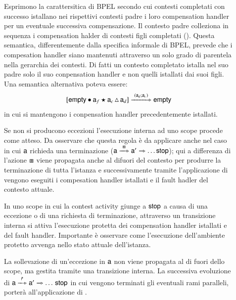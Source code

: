 \begin{description}
  \item[ ] Esprimono la carattersitica
  di BPEL secondo cui contesti completati con successo istallano nei rispettivi
  contesti padre i loro compensation handler per un eventuale successiva
  compensazione. Il contesto padre colleziona in sequenza i compensation halder
  di contesti figli completati (). Questa
  semantica, differentemente dalla specifica informale di BPEL, prevede che i
  compesation handler siano mantenuti attraverso un solo grado di parentela
  nella gerarchia dei contesti. Di fatti un contesto completato istalla nel suo
  padre solo il suo conpensation handler e non quelli istallati dai suoi figli.
  Una semantica alternativa poteva essere:
  $$
  \xinstnostate{\xsigma}{\xscope{\xskip}{\xs_f}{\xs_c}{\xs_d}}
\bpeltsarrow{\xdonel{\xs_d;\xs_c}}
\xinstnostate{\xsigma}{\xskip} 
  $$
  in cui si mantengono i conpensation handler precedentemente istallati.

  \item[] Se non si producono eccezioni l'esecuzione
  interna ad uno scope procede come atteso. Da osservare che questa regola è da
  applicare anche nel caso in cui ${\sf a}$ richieda una terminazione 
  (${\xs} \bpeltsarrow{\xexitl} \xs' \bpeltsarrow{} \ldots {\xstop}$); qui a
  differenza di  l'azione $\boxast$ viene propagata anche al difuori
  del contesto per produrre la terminazione di tutta l'istanza e successivamente
  tramite l'applicazione di  vengono eseguiti i
  compesation handler istallati e il fault hadler del contesto attuale.
  
  \item[] In uno scope in cui la contest activity giunge a 
  ${\sf stop}$ a causa di una eccezione o di una richiesta di terminazione,
  attraverso un transizione interna si attiva l'esecuzione protetta dei
  compensation handler istallati e del fault handler. Importante è osservare
  come l'esecuzione dell'ambiente protetto avvenga nello stato attuale
  dell'istanza.
  
  \item[] La sollevazione di un'eccezione in ${\sf a}$ non
  viene propagata al di fuori dello scope, ma gestita tramite una transizione
  interna.  La successiva evoluzione di ${\xs} \bpeltsarrow{\xthrl} \xs'
  \bpeltsarrow{} \ldots \, {\xstop}$ in cui vengono terminati gli eventuali
  rami paralleli, porterà all'applicazione di . 
\end{description}

